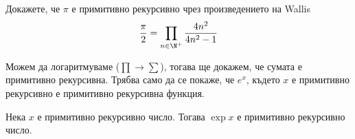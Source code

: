 \begin{problem}
    Докажете, че $\pi$ е примитивно рекурсивно чрез произведението на Wallis\cite{wallis1972arithmetica}
    \begin{equation}\label{eq:wallis-formula}
        \frac{\pi}{2} = \prod\limits_{n\in \N^+}\frac{4n^2}{4n^2 - 1}
    \end{equation}
\end{problem}
\begin{hint}
    Можем да логаритмуваме ($\prod \to \sum$), тогава ще докажем, че сумата е примитивно рекурсивна. Трябва само да се покаже, че $e^x$, където $x$ е примитивно рекурсивно е примитивно рекурсивна функция.
\end{hint}
\begin{proposition} \label{prop:exp-prim-rec}
    Нека $x$ е примитивно рекурсивно число. Тогава $\exp x$ е примитивно рекурсивно число.
\end{proposition}

